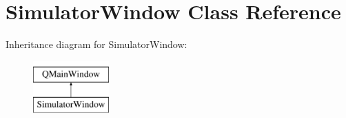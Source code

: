 \hypertarget{class_simulator_window}{}\section{Simulator\+Window Class Reference}
\label{class_simulator_window}
Inheritance diagram for Simulator\+Window\+:\begin{figure}[H]
\begin{center}
\leavevmode
\includegraphics[height=2.000000cm]{class_simulator_window}
\end{center}
\end{figure}
